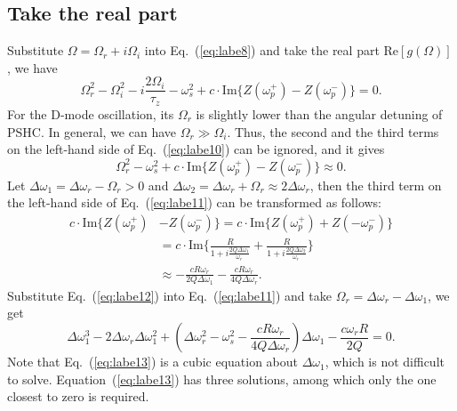\documentclass[%
 reprint,
 amsmath,amssymb,
 aps,
]{revtex4-1}
\begin{document}
\subsection{\label{sec:level3.1} Take the real part}
Substitute $\Omega=\Omega_r + i\Omega_i$ into Eq.~(\ref{eq:labe8}) and take the real part $\mathrm {Re}[g(\Omega)]$, we have 
\begin{equation}\label{eq:labe10}
   \Omega^2_r-\Omega^2_i-i\frac{2\Omega_i}{\tau_z}-\omega^2_s+c \cdot \mathrm {Im}\{Z(\omega^{+}_p)-Z(\omega^{-}_p)\}=0.
\end{equation}
For the D-mode oscillation, its $\Omega_r$ is slightly lower than the angular detuning of PSHC. In general, we can have $\Omega_r \gg \Omega_i$. Thus, the second and the third terms on the left-hand side of Eq.~(\ref{eq:labe10}) can be ignored, and it gives
\begin{equation}\label{eq:labe11}
   \Omega^2_r-\omega^2_s+c \cdot \mathrm {Im}\{Z(\omega^{+}_p)-Z(\omega^{-}_p)\}\approx 0.
\end{equation}
Let $\Delta \omega_1=\Delta \omega_r-\Omega_r>0$ and $\Delta \omega_2=\Delta \omega_r+\Omega_r \approx 2\Delta \omega_r$, then the third term on the left-hand side of Eq.~(\ref{eq:labe11}) can be transformed as follows:
\begin{equation}\label{eq:labe12}
   \begin{aligned}
   c \cdot \mathrm {Im}\{Z(\omega^{+}_p)&-Z(\omega^{-}_p)\}=c \cdot \mathrm {Im}\{Z(\omega^{+}_p)+Z(-\omega^{-}_p)\}\\
   &=c \cdot \mathrm {Im}\{\frac{R}{1+i\frac{2Q\Delta\omega_1}{\omega_r}}+\frac{R}{1+i\frac{2Q\Delta\omega_2}{\omega_r}}\}\\
   &\approx -\frac{cR\omega_r}{2Q\Delta\omega_1}-\frac{cR\omega_r}{4Q\Delta\omega_r}.
   \end{aligned}
\end{equation}
Substitute Eq.~(\ref{eq:labe12}) into Eq.~(\ref{eq:labe11}) and take $\Omega_r=\Delta\omega_r-\Delta\omega_1$, we get
\begin{equation}\label{eq:labe13}
   \Delta\omega^3_1-2\Delta\omega_r \Delta\omega^2_1+(\Delta\omega^2_r-\omega^2_s-\frac{cR\omega_r}{4Q\Delta\omega_r})\Delta\omega_1-\frac{c\omega_r R}{2Q}=0.
\end{equation}
Note that Eq.~(\ref{eq:labe13}) is a cubic equation about $\Delta\omega_1$, which is not difficult to solve. Equation~(\ref{eq:labe13}) has three solutions, among which only the one closest to zero is required.
\end{document}
